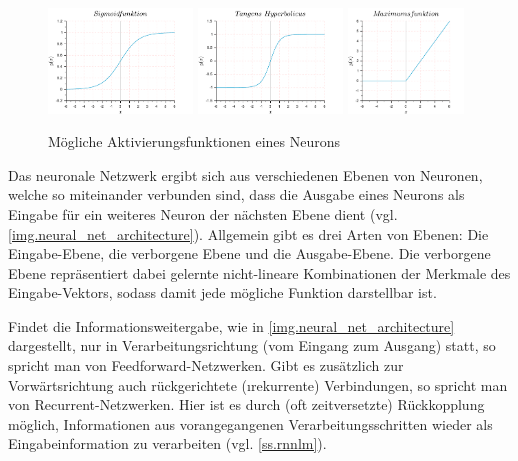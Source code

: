 \begin{figure}[H]
\centering
{}
{\includegraphics[width=0.3425\textwidth]{images/sigmoid_function}}
{\includegraphics[width=0.3425\textwidth]{images/tanh_function}}
{\includegraphics[width=0.275\textwidth]{images/max_function}}
\caption[Aktivierungsfunktionen eines Neurons]{Mögliche Aktivierungsfunktionen eines Neurons}\label{img.activatefunctions}
\end{figure}

Das neuronale Netzwerk ergibt sich aus verschiedenen Ebenen von Neuronen, welche so miteinander verbunden sind, dass die Ausgabe eines Neurons als Eingabe für ein weiteres Neuron der nächsten Ebene dient (vgl. \autoref{img.neural_net_architecture}). Allgemein gibt es drei Arten von Ebenen: Die Eingabe-Ebene, die verborgene Ebene und die Ausgabe-Ebene. Die verborgene Ebene repräsentiert dabei gelernte nicht-lineare Kombinationen der Merkmale des Eingabe-Vektors, sodass damit jede mögliche Funktion darstellbar ist.

Findet die Informationsweitergabe, wie in \autoref{img.neural_net_architecture} dargestellt, nur in Verarbeitungsrichtung (vom Eingang zum Ausgang) statt, so spricht man von Feedforward-Netzwerken. Gibt es zusätzlich zur Vorwärtsrichtung auch rückgerichtete (\i{rekurrente}) Verbindungen, so spricht man von Recurrent-Netzwerken. Hier ist es durch (oft zeitversetzte) Rückkopplung möglich, Informationen aus vorangegangenen Verarbeitungsschritten wieder als Eingabeinformation zu verarbeiten (vgl. \autoref{ss.rnnlm}).

